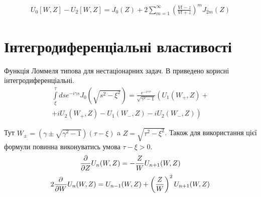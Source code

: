 %
%
\begin{equation} \begin{aligned}
U_0 [W, Z] - U_2 [W, Z] = J_0(Z) + 2 \sum_{m=1}^{\infty} \left( 
\frac{\mathit{V}t - z}{\mathit{V}t + z} \right)^m J_{2m} (Z)
\end{aligned} \end{equation}

\section{Інтегродиференціальні властивості}

Функція Ломмеля типова для нестаціонарних задач. В \cite[ст. 41]{imp:Borisov1991} 
приведено корисні інтегродиференціальні.
%
\begin{equation} \begin{aligned}
\int \limits_{\xi}^{\tau} ds e^{-i \gamma s} J_0(\sqrt{s^2 - \xi^2 }) = 
\frac{e^{-i \gamma \tau}}{\sqrt{\gamma^2 - 1}} \left( U_1(W_+,Z) + \right. \\ 
\left. + i U_2(W_+,Z) - U_1(W_-,Z) - i U_2(W_-,Z) \right)
\end{aligned} \end{equation}

Тут $ W_\pm = (\gamma \pm \sqrt{\gamma^2 - 1}) (\tau - \xi) $ a 
$ Z = \sqrt{\tau^2 - \xi^2} $. Також для використання цієї формули повинна
виконуватись умова $ \tau - \xi > 0 $.
%
%
\begin{equation} 
\frac{\partial }{\partial Z} U_n (W,Z) = - \frac{Z}{W} U_{n+1} (W,Z)
\end{equation}
%
\begin{equation}
2 \frac{\partial }{\partial W} U_n (W,Z) = U_{n-1} (W,Z) + 
\left( \frac{Z}{W} \right)^2 U_{n+1} (W,Z)
\end{equation}

